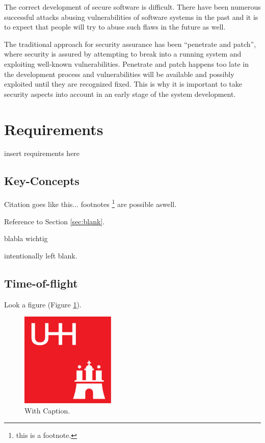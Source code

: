 \documentclass{acmtog} %
\begin{document}
The correct development of secure software is difficult.
There have been numerous successful attacks abusing vulnerabilities of software systems in the past and it is to expect that people will try to abuse such flaws in the future as well.

The traditional approach for security assurance has been ``penetrate and patch'', where security is assured by attempting to break into a running system and exploiting well-known vulnerabilities.
Penetrate and patch happens too late in the development process and vulnerabilities will be available and possibly exploited  until they are recognized fixed.
This is why it is important to take security aspects into account in an early stage of the system development.


\section{Requirements}
\label{sec:requirements}
insert requirements here

\subsection{Key-Concepts}



Citation goes like this... \cite{SHRB11}
footnotes \footnote{this is a footnote.} are possible aswell.

Reference to Section \ref{sec:blank}.

blabla wichtig

intentionally left blank.

\subsection{Time-of-flight}

Look a figure (Figure \ref{fig:figure}).
\begin{figure}[ht]
\centerline{\includegraphics[width=4.5cm]{img/uhh}}
\caption{With Caption.}
    \label{fig:figure}
\end{figure}
\end{document}

